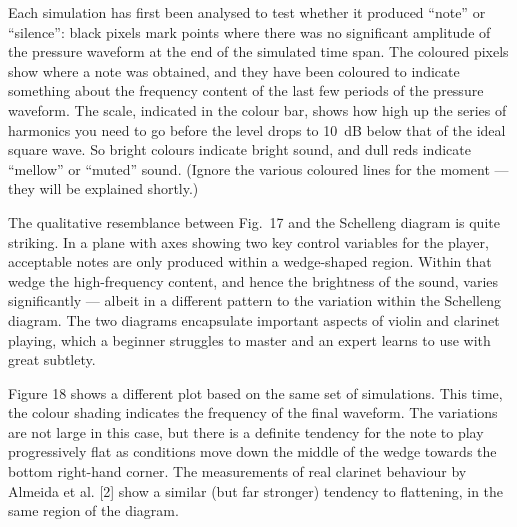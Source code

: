 
  Each simulation has first been analysed to test whether it produced “note” or 
  “silence”: black pixels mark points where there was no significant amplitude 
  of the pressure waveform at the end of the simulated time span. The coloured 
  pixels show where a note was obtained, and they have been coloured to 
  indicate something about the frequency content of the last few periods of the 
  pressure waveform. The scale, indicated in the colour bar, shows how high up 
  the series of harmonics you need to go before the level drops to 10~dB below 
  that of the ideal square wave. So bright colours indicate bright sound, and 
  dull reds indicate “mellow” or “muted” sound. (Ignore the various coloured 
  lines for the moment --- they will be explained shortly.) 

  The qualitative resemblance between Fig.\ 17 and the Schelleng diagram is 
  quite striking. In a plane with axes showing two key control variables for 
  the player, acceptable notes are only produced within a wedge-shaped region. 
  Within that wedge the high-frequency content, and hence the brightness of the 
  sound, varies significantly — albeit in a different pattern to the variation 
  within the Schelleng diagram. The two diagrams encapsulate important aspects 
  of violin and clarinet playing, which a beginner struggles to master and an 
  expert learns to use with great subtlety. 

  Figure 18 shows a different plot based on the same set of simulations. This 
  time, the colour shading indicates the frequency of the final waveform. The 
  variations are not large in this case, but there is a definite tendency for 
  the note to play progressively flat as conditions move down the middle of the 
  wedge towards the bottom right-hand corner. The measurements of real clarinet 
  behaviour by Almeida et al. [2] show a similar (but far stronger) tendency to 
  flattening, in the same region of the diagram. 


